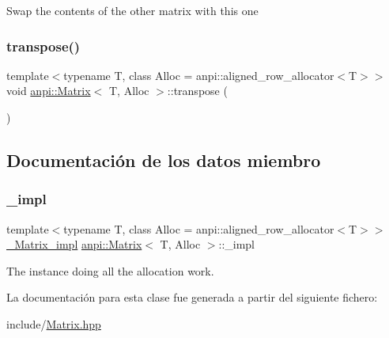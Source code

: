 Swap the contents of the other matrix with this one \mbox{\label{classanpi_1_1Matrix_a302741339084245047d417815cc13a62}} 
\subsubsection{\texorpdfstring{transpose()}{transpose()}}
{\footnotesize\ttfamily template$<$typename T, class Alloc = anpi\+::aligned\+\_\+row\+\_\+allocator$<$\+T$>$$>$ \\
void \hyperlink{classanpi_1_1Matrix}{anpi\+::\+Matrix}$<$ T, Alloc $>$\+::transpose (\begin{DoxyParamCaption}{ }\end{DoxyParamCaption})}



\subsection{Documentación de los datos miembro}
\mbox{\label{classanpi_1_1Matrix_ac6084447aba4417abc18f378f3378e8f}} 
\subsubsection{\texorpdfstring{\+\_\+impl}{\_impl}}
{\footnotesize\ttfamily template$<$typename T, class Alloc = anpi\+::aligned\+\_\+row\+\_\+allocator$<$\+T$>$$>$ \\
\hyperlink{structanpi_1_1Matrix_1_1__Matrix__impl}{\+\_\+\+Matrix\+\_\+impl} \hyperlink{classanpi_1_1Matrix}{anpi\+::\+Matrix}$<$ T, Alloc $>$\+::\+\_\+impl\hspace{0.3cm}{\ttfamily [protected]}}



The instance doing all the allocation work. 



La documentación para esta clase fue generada a partir del siguiente fichero\+:\begin{DoxyCompactItemize}
\item 
include/\hyperlink{Matrix_8hpp}{Matrix.\+hpp}\end{DoxyCompactItemize}

